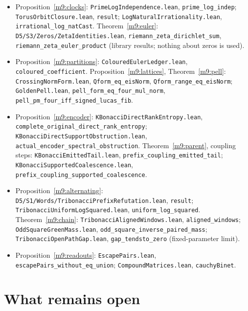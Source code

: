 \documentclass[11pt,reqno]{amsart}
\theoremstyle{definition}
\theoremstyle{remark}
\numberwithin{equation}{section}
\begin{document}
{\begin{itemize}[leftmargin=1.5em]
\item Proposition~\ref{m9:clocks}: \texttt{PrimeLogIndependence.lean}, \texttt{prime\_log\_indep}; \texttt{TorusOrbitClosure.lean}, \texttt{result};
\texttt{LogNaturalIrrationality.lean}, \texttt{irrational\_log\_natCast}. Theorem~\ref{m9:euler}: \texttt{D5/S3/Zeros/ZetaIdentities.lean},
\texttt{riemann\_zeta\_dirichlet\_sum}, \texttt{riemann\_zeta\_euler\_product} (library results; nothing about zeros is used).
\item Proposition~\ref{m9:partitions}: \texttt{ColouredEulerLedger.lean}, \texttt{coloured\_coefficient}. Proposition~\ref{m9:lattices},
Theorem~\ref{m9:pell}: \texttt{CrossingNormForm.lean}, \texttt{Qform\_eq\_eisNorm}, \texttt{Qform\_range\_eq\_eisNorm}; \texttt{GoldenPell.lean},
\texttt{pell\_form\_eq\_four\_mul\_norm}, \texttt{pell\_pm\_four\_iff\_signed\_lucas\_fib}.
\item Proposition~\ref{m9:encoder}: \texttt{KBonacciDirectRankEntropy.lean}, \texttt{complete\_original\_direct\_rank\_entropy};
\texttt{KBonacciDirectSupportObstruction.lean}, \texttt{actual\_encoder\_spectral\_obstruction}. Theorem~\ref{m9:parent}, coupling steps:
\texttt{KBonacciEmittedTail.lean}, \texttt{prefix\_coupling\_emitted\_tail}; \texttt{KBonacciSupportedCoalescence.lean},
\texttt{prefix\_coupling\_supported\_coalescence}.
\item Proposition~\ref{m9:alternating}: \texttt{D5/S1/Words/TribonacciPrefixRefutation.lean}, \texttt{result};
\texttt{TribonacciUniformLogSquared.lean}, \texttt{uniform\_log\_squared}. Theorem~\ref{m9:chain}: \texttt{TribonacciAlignedWindows.lean},
\texttt{aligned\_windows}; \texttt{OddSquareGreenMass.lean}, \texttt{odd\_square\_inverse\_paired\_mass}; \texttt{TribonacciOpenPathGap.lean},
\texttt{gap\_tendsto\_zero} (fixed-parameter limit).
\item Proposition~\ref{m9:readouts}: \texttt{EscapePairs.lean}, \texttt{escapePairs\_without\_eq\_union}; \texttt{CompoundMatrices.lean}, \texttt{cauchyBinet}.
\end{itemize}}

\section{What remains open}\label{sec:open}
\end{document}
